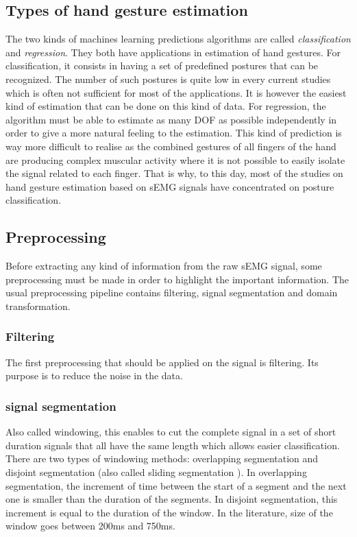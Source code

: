 \documentclass{article}
\begin{document}
	
\subsection{Types of hand gesture estimation}

The two kinds of machines learning predictions algorithms are called \textit{classification} and \textit{regression}. They both have applications in estimation of hand gestures. For classification, it consists in having a set of predefined postures that can be recognized. The number of such postures is quite low in every current studies which is often not sufficient for most of the applications. It is however the easiest kind of estimation that can be done on this kind of data. For regression, the algorithm must be able to estimate as many DOF as possible independently in order to give a more natural feeling to the estimation. This kind of prediction is way more difficult to realise as the combined gestures of all fingers of the hand are producing complex muscular activity where it is not possible to easily isolate the signal related to each finger. That is why, to this day, most of the studies on hand gesture estimation based on sEMG signals have concentrated on posture classification. 


\subsection{Preprocessing}

Before extracting any kind of information from the raw sEMG signal, some preprocessing must be made in order to highlight the important information. The usual preprocessing pipeline contains filtering, signal segmentation and domain transformation.

\subsubsection{Filtering}

The first preprocessing that should be applied on the signal is filtering. Its purpose is to reduce the noise in the data. \cite{ref:classification3, ref:classification4}


\subsubsection{signal segmentation}

Also called windowing, this enables to cut the complete signal in a set of short duration signals that all have the same length which allows easier classification. There are two types of windowing methods: overlapping segmentation and disjoint segmentation (also called sliding segmentation \cite{ref:classification1}). In overlapping segmentation, the increment of time between the start of a segment and the next one is smaller than the duration of the segments. In disjoint segmentation, this increment is equal to the duration of the window\cite{ref:classification3, ref:classification4}. In the literature, size of the window goes between 200ms and 750ms.
\end{document}
